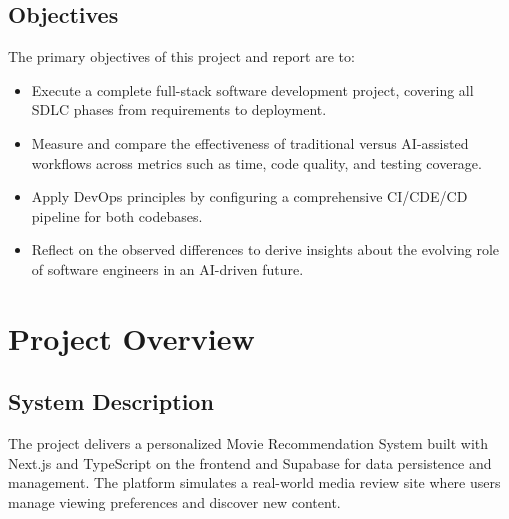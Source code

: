 \documentclass[a4paper,12pt]{report}
\begin{document}
\section{Objectives}
The primary objectives of this project and report are to:
\begin{itemize}
  \item Execute a complete full-stack software development project, covering all SDLC phases from requirements to deployment.
  \item Measure and compare the effectiveness of traditional versus AI-assisted workflows across metrics such as time, code quality, and testing coverage.
  \item Apply DevOps principles by configuring a comprehensive CI/CDE/CD pipeline for both codebases.
  \item Reflect on the observed differences to derive insights about the evolving role of software engineers in an AI-driven future.
\end{itemize}

\chapter{Project Overview}

\section{System Description}
The project delivers a personalized Movie Recommendation System built with Next.js and TypeScript on the frontend and Supabase for data persistence and management. The platform simulates a real-world media review site where users manage viewing preferences and discover new content.
\end{document}
